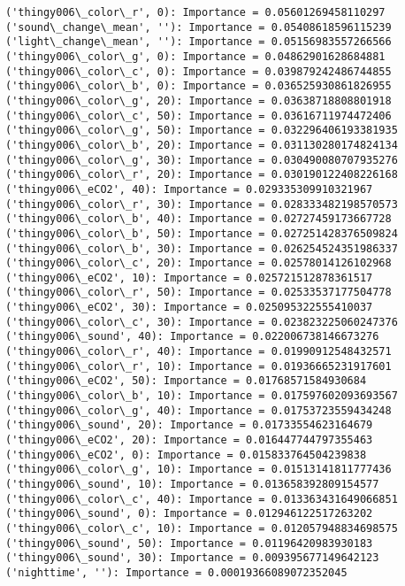 \documentclass[11pt]{article}
\begin{document}
    \begin{Verbatim}[commandchars=\\\{\}]
('thingy006\_color\_r', 0): Importance = 0.05601269458110297
('sound\_change\_mean', ''): Importance = 0.05408618596115239
('light\_change\_mean', ''): Importance = 0.05156983557266566
('thingy006\_color\_g', 0): Importance = 0.04862901628684881
('thingy006\_color\_c', 0): Importance = 0.039879242486744855
('thingy006\_color\_b', 0): Importance = 0.036525930861826955
('thingy006\_color\_g', 20): Importance = 0.03638718808801918
('thingy006\_color\_c', 50): Importance = 0.03616711974472406
('thingy006\_color\_g', 50): Importance = 0.032296406193381935
('thingy006\_color\_b', 20): Importance = 0.031130280174824134
('thingy006\_color\_g', 30): Importance = 0.030490080707935276
('thingy006\_color\_r', 20): Importance = 0.030190122408226168
('thingy006\_eCO2', 40): Importance = 0.029335309910321967
('thingy006\_color\_r', 30): Importance = 0.028333482198570573
('thingy006\_color\_b', 40): Importance = 0.02727459173667728
('thingy006\_color\_b', 50): Importance = 0.027251428376509824
('thingy006\_color\_b', 30): Importance = 0.026254524351986337
('thingy006\_color\_c', 20): Importance = 0.02578014126102968
('thingy006\_eCO2', 10): Importance = 0.025721512878361517
('thingy006\_color\_r', 50): Importance = 0.02533537177504778
('thingy006\_eCO2', 30): Importance = 0.025095322555410037
('thingy006\_color\_c', 30): Importance = 0.023823225060247376
('thingy006\_sound', 40): Importance = 0.022006738146673276
('thingy006\_color\_r', 40): Importance = 0.01990912548432571
('thingy006\_color\_r', 10): Importance = 0.01936665231917601
('thingy006\_eCO2', 50): Importance = 0.01768571584930684
('thingy006\_color\_b', 10): Importance = 0.017597602093693567
('thingy006\_color\_g', 40): Importance = 0.01753723559434248
('thingy006\_sound', 20): Importance = 0.01733554623164679
('thingy006\_eCO2', 20): Importance = 0.016447744797355463
('thingy006\_eCO2', 0): Importance = 0.015833764504239838
('thingy006\_color\_g', 10): Importance = 0.01513141811777436
('thingy006\_sound', 10): Importance = 0.013658392809154577
('thingy006\_color\_c', 40): Importance = 0.013363431649066851
('thingy006\_sound', 0): Importance = 0.012946122517263202
('thingy006\_color\_c', 10): Importance = 0.012057948834698575
('thingy006\_sound', 50): Importance = 0.01196420983930183
('thingy006\_sound', 30): Importance = 0.009395677149642123
('nighttime', ''): Importance = 0.00019366089072352045
    \end{Verbatim}
\end{document}
